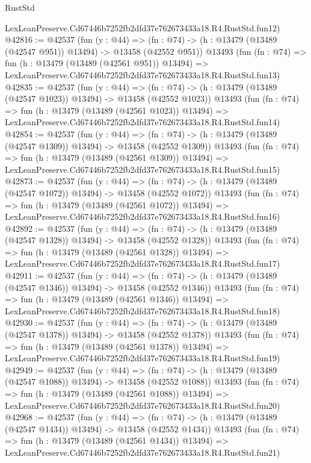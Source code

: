 \begin{lexlean}{RustStd}
\begin{coremodule}
    LexLeanPreserve.Cd67446b7252fb2dfd37e762673433a18.R4.RustStd.fun12)
@42816 := @42537
    (fun (y : @44) =>
    (fn : @74) -> (h : @13479 (@13489 (@42547 @951)) @13494) -> @13458 (@42552 @951))
    @13493
    (fun (fn : @74) =>
    fun (h : @13479 (@13489 (@42561 @951)) @13494) =>
    LexLeanPreserve.Cd67446b7252fb2dfd37e762673433a18.R4.RustStd.fun13)
@42835 := @42537
    (fun (y : @44) =>
    (fn : @74) -> (h : @13479 (@13489 (@42547 @1023)) @13494) -> @13458 (@42552 @1023))
    @13493
    (fun (fn : @74) =>
    fun (h : @13479 (@13489 (@42561 @1023)) @13494) =>
    LexLeanPreserve.Cd67446b7252fb2dfd37e762673433a18.R4.RustStd.fun14)
@42854 := @42537
    (fun (y : @44) =>
    (fn : @74) -> (h : @13479 (@13489 (@42547 @1309)) @13494) -> @13458 (@42552 @1309))
    @13493
    (fun (fn : @74) =>
    fun (h : @13479 (@13489 (@42561 @1309)) @13494) =>
    LexLeanPreserve.Cd67446b7252fb2dfd37e762673433a18.R4.RustStd.fun15)
@42873 := @42537
    (fun (y : @44) =>
    (fn : @74) -> (h : @13479 (@13489 (@42547 @1072)) @13494) -> @13458 (@42552 @1072))
    @13493
    (fun (fn : @74) =>
    fun (h : @13479 (@13489 (@42561 @1072)) @13494) =>
    LexLeanPreserve.Cd67446b7252fb2dfd37e762673433a18.R4.RustStd.fun16)
@42892 := @42537
    (fun (y : @44) =>
    (fn : @74) -> (h : @13479 (@13489 (@42547 @1328)) @13494) -> @13458 (@42552 @1328))
    @13493
    (fun (fn : @74) =>
    fun (h : @13479 (@13489 (@42561 @1328)) @13494) =>
    LexLeanPreserve.Cd67446b7252fb2dfd37e762673433a18.R4.RustStd.fun17)
@42911 := @42537
    (fun (y : @44) =>
    (fn : @74) -> (h : @13479 (@13489 (@42547 @1346)) @13494) -> @13458 (@42552 @1346))
    @13493
    (fun (fn : @74) =>
    fun (h : @13479 (@13489 (@42561 @1346)) @13494) =>
    LexLeanPreserve.Cd67446b7252fb2dfd37e762673433a18.R4.RustStd.fun18)
@42930 := @42537
    (fun (y : @44) =>
    (fn : @74) -> (h : @13479 (@13489 (@42547 @1378)) @13494) -> @13458 (@42552 @1378))
    @13493
    (fun (fn : @74) =>
    fun (h : @13479 (@13489 (@42561 @1378)) @13494) =>
    LexLeanPreserve.Cd67446b7252fb2dfd37e762673433a18.R4.RustStd.fun19)
@42949 := @42537
    (fun (y : @44) =>
    (fn : @74) -> (h : @13479 (@13489 (@42547 @1088)) @13494) -> @13458 (@42552 @1088))
    @13493
    (fun (fn : @74) =>
    fun (h : @13479 (@13489 (@42561 @1088)) @13494) =>
    LexLeanPreserve.Cd67446b7252fb2dfd37e762673433a18.R4.RustStd.fun20)
@42968 := @42537
    (fun (y : @44) =>
    (fn : @74) -> (h : @13479 (@13489 (@42547 @1434)) @13494) -> @13458 (@42552 @1434))
    @13493
    (fun (fn : @74) =>
    fun (h : @13479 (@13489 (@42561 @1434)) @13494) =>
    LexLeanPreserve.Cd67446b7252fb2dfd37e762673433a18.R4.RustStd.fun21)

\end{coremodule}
\end{lexlean}
